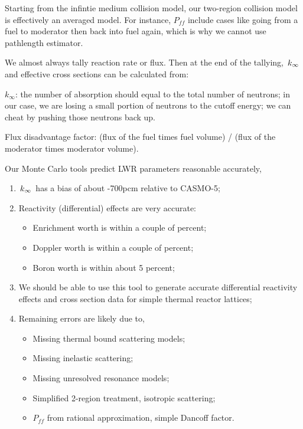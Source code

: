 \documentclass{school-22.211-notes}
\begin{document}
\clearpage
{}
Starting from the infintie medium collision model, our two-region collision model is effectively an averaged model. For instance, $P_{ff}$ include cases like going from a fuel to moderator then back into fuel again, which is why we cannot use pathlength estimator. 

We almost always tally reaction rate or flux. Then at the end of the tallying, 
$\left. k_{\infty} \right.$ and effective cross sections can be calculated from:



$k_{\infty}$: the number of absorption should equal to the total number of neutrons; in our case, we are losing a small portion of neutrons to the cutoff energy; we can cheat by pushing those neutrons back up. 

Flux disadvantage factor: (flux of the fuel times fuel volume) / (flux of the moderator times moderator volume). 

Our Monte Carlo tools predict LWR parameters reasonable accurately,
\begin{enumerate}
\item $\left. k_{\infty} \right.$ has a bias of about -700pcm relative to CASMO-5;
\item Reactivity (differential) effects are very accurate:
  \begin{itemize}
  \item Enrichment worth is within a couple of percent;
  \item Doppler worth is within a couple of percent;
  \item Boron worth is within about 5 percent;
  \end{itemize}
\item We should be able to use this tool to generate accurate differential reactivity effects and cross section data for simple thermal reactor lattices;
\item Remaining errors are likely due to,
  \begin{itemize}
    \item Missing thermal bound scattering models;
    \item Missing inelastic scattering;
    \item Missing unresolved resonance models;
    \item Simplified 2-region treatment, isotropic scattering;
    \item $P_{ff}$ from rational approximation, simple Dancoff factor. 
  \end{itemize}
\end{enumerate}
\end{document}
